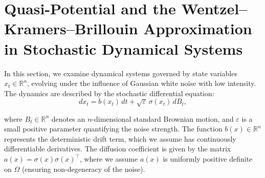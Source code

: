 \documentclass[11pt]{article}
\theoremstyle{plain}      %
\theoremstyle{definition} %
\begin{document}
 


 

\setcounter{equation}{0}
\section{Quasi-Potential and the Wentzel–Kramers–Brillouin Approximation in Stochastic Dynamical Systems} \label{qpsec}

In this section, we examine dynamical systems governed by state variables \( x_t \in \mathbb{R}^n \), evolving under the influence of Gaussian white noise with low intensity. The dynamics are described by the stochastic differential equation:
\begin{equation}
\label{sde}
dx_t = b(x_t)\,dt + \sqrt{\varepsilon}\,\sigma(x_t)\,dB_t,
\end{equation}

where $B_t \in \mathbb{R}^n$ denotes an $n$-dimensional standard Brownian motion, and $\varepsilon$ is a small positive parameter quantifying the noise strength. The function $b(x) \in \mathbb{R}^n$ represents the deterministic drift term, which we assume has continuously differentiable derivatives. The diffusion coefficient is given by the matrix $a(x) = \sigma(x)\sigma(x)^\top$, where we assume $a(x)$ is uniformly positive definite on $\Omega$ (ensuring non-degeneracy of the noise).
\end{document}
